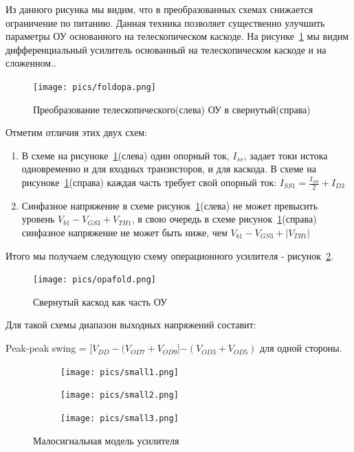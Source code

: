 \documentclass[a4paper,12pt,oneside]{scrartcl}
\begin{document}
Из данного рисунка мы видим, что в преобразованных схемах снижается ограничение по питанию. Данная техника позволяет существенно улучшить параметры ОУ основанного на телескопическом каскоде. На рисунке~\ref{fig:Foldopa} мы видим дифференциальный усилитель основанный на телескопическом каскоде и на сложенном..~\cite{B8}

\begin{figure}[!htb]
\centering
\texttt{[image: pics/foldopa.png]}
\caption{Преобразование телескопического(слева) ОУ в свернутый(справа)}
\label{fig:Foldopa}
\end{figure}
\FloatBarrier

Отметим отличия этих двух схем:
\begin{enumerate}
    \item В схеме на рисуноке~\ref{fig:Foldopa}(слева) один опорный ток, $I_{ss}$, задает токи истока одновременно и для входных транзисторов, и для каскода.  В схеме на рисуноке~\ref{fig:Foldopa}(справа) каждая часть требует свой опорный ток: $I_{SS1}=\frac{I_{SS}}{2}+I_{D3}$
	\item 	Синфазное напряжение в схеме рисунок~\ref{fig:Foldopa}(слева) не может превысить уровень $V_{b1}-V_{GS3}+V_{TH1}$, в свою очередь в схеме рисунок~\ref{fig:Foldopa}(справа) синфазное напряжение не может быть ниже, чем $V_{b1}-V_{GS3}+|V_{TH1}|$
\end{enumerate}
Итого мы получаем следующую схему операционного усилителя - рисунок~\ref{fig:Opafold}.
\begin{figure}[!htb]
\centering
\texttt{[image: pics/opafold.png]}
\caption{Свернутый каскод как часть ОУ}
\label{fig:Opafold}
\end{figure}
\FloatBarrier
Для такой схемы диапазон выходных напряжений составит:

Peak-peak swing = [$V_{DD}-(V_{OD7}+ V_{OD9}$]$-(V_{OD3}+V_{OD5})$ для одной стороны.

\begin{figure}[!h]
    \begin{subfigure}[b]{0.33\textwidth}
        \texttt{[image: pics/small1.png]}
        \label{fig:sm1}
    \end{subfigure}%
    \begin{subfigure}[b]{0.33\textwidth}
        \texttt{[image: pics/small2.png]}
        \label{fig:sm2}
    \end{subfigure}%
    \begin{subfigure}[b]{0.33\textwidth}
        \texttt{[image: pics/small3.png]}
        \label{fig:sm3}
    \end{subfigure}%
    \label{fig:small}
    \caption{Малосигнальная модель усилителя} 
\end{figure}
\FloatBarrier
\end{document}
